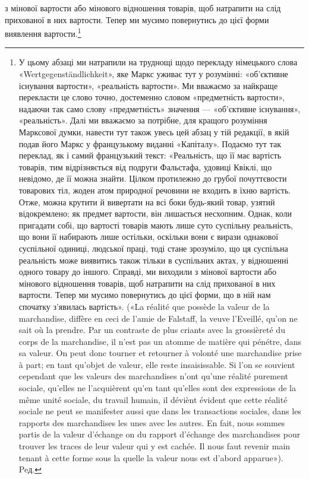 \parcont{}  %
з мінової вартости або мінового відношення товарів, щоб натрапити
на слід прихованої в них вартости. Тепер ми мусимо повернутись
до цієї форми виявлення вартости.\footnote*{
У цьому абзаці ми натрапили на труднощі щодо перекладу німецького
слова «Wertgegenständlichkeit», яке Маркс уживає тут у розумінні:
«об’єктивне існування вартости», «реальність вартости». Ми
вважаємо за найкраще перекласти це слово точно, достеменно словом
«предметність вартости», надаючи так само слову «предметність» значення
— «об’єктивне існування», «реальність». Далі ми вважаємо за
потрібне, для кращого розуміння Марксової думки, навести тут також
увесь цей абзац у тій редакції, в якій подав його Маркс у французькому
виданні «Капіталу». Подаємо тут так переклад, як і самий французький
текст: «Реальність, що її має вартість товарів, тим відрізняється від
подруги Фальстафа, удовиці Квіклі, що невідомо, де її можна знайти.
Цілком протилежно до грубої почуттєвости товарових тіл, жоден атом
природної речовини не входить в їхню вартість. Отже, можна крутити й
вивертати на всі боки будь-який товар, узятий відокремлено; як предмет
вартости, він лишається несхопним. Однак, коли пригадати собі, що
вартості товарів мають лише суто суспільну реальність, що вони її набирають
лише остільки, оскільки вони є вирази однакової суспільної одиниці,
людської праці, тоді стане зрозуміло, що ця суспільна реальність
може виявитись також тільки в суспільних актах, у відношенні одного
товару до іншого. Справді, ми виходили з мінової вартости або мінового
відношення товарів, щоб натрапити на слід прихованої в них вартости.
Тепер ми мусимо повернутись до цієї форми, що в ній нам спочатку з’явилась
вартість». («La réalité que possède la valeur de la marchandise, diffère
en ceci de l’amie de Falstaff, la veuve l’Eveillé, qu’on ne sait où la prendre.
Par un contraste de plus criants avec la grossièreté du corps de la marchandise,
il n’est pas un atomme de matière qui pénétre, dans sa valeur. On peut
donc tourner et retourner à volonté une marchandise prise à part; en tant
qu’objet de valeur, elle reste insaisissable. Si l’on se souvient cependant
que les valeurs des marchandises n’ont qu’une réalité purement sociale,
qu’elles ne l’acquièrent qu’en tant qu’elles sont des expressions de la même
unité sociale, du travail humain, il déviènt évident que cette réalité sociale
ne peut se manifester aussi que dans les transactions sociales, dans les
rapports des marchandises les unes avec les autres. En fait, nous sommes
partis de la valeur d’échange on du rapport d’échange des marchandises
pour trouver les traces de leur valeur qui y est cachée. Il nous faut revenir
main tenant à cette forme sous la quelle la valeur nous est d’abord
apparue»). Peд.
}

